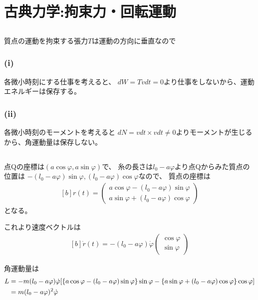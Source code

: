 \documentclass[../ap_2012.tex]{subfiles}
\begin{document}
\setcounter{chapter}{0}
\chapter{古典力学:拘束力・回転運動}
\section{}
質点の運動を拘束する張力\(T\)は運動の方向に垂直なので
\subsection*{(i)}
各微小時刻にする仕事を考えると、
\(dW=T\dot vdt=0\)より仕事をしないから、運動エネルギーは保存する。
\subsection*{(ii)}
各微小時刻のモーメントを考えると
\(dN=vdt\times vdt\neq 0\)よりモーメントが生じるから、角運動量は保存しない。

\section{}
点Qの座標は\((a\cos\varphi,a\sin\varphi)\)で、
糸の長さは\(l_0-a\varphi\)より点Qからみた質点の位置は
\(-(l_0-a\varphi)\sin\varphi,(l_0-a\varphi)\cos\varphi\)なので、
質点の座標は
\begin{equation}\begin{aligned}[b]
    r(t) = \begin{pmatrix}
        a\cos\varphi-(l_0-a\varphi)\sin\varphi\\
        a\sin\varphi+(l_0-a\varphi)\cos\varphi
    \end{pmatrix}
\end{aligned}\end{equation}
となる。

これより速度ベクトルは
\begin{equation}\begin{aligned}[b]
    \dot{r}(t) =-(l_0-a\varphi)\dot{\varphi}\begin{pmatrix}
        \cos\varphi\\\sin\varphi
    \end{pmatrix}
\end{aligned}\end{equation}

角運動量は
\begin{equation}\begin{aligned}[b]
    L&=-m(l_0-a\varphi)\dot{\varphi}\qty[
        \qty{a\cos\varphi-(l_0-a\varphi)\sin\varphi}\sin\varphi
        -\qty{a\sin\varphi+(l_0-a\varphi)\cos\varphi}\cos\varphi]\\
    &=m(l_0-a\varphi)^2\dot{\varphi}
\end{aligned}\end{equation}
\end{document}
